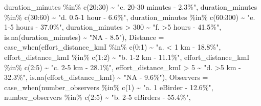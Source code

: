 \documentclass[
]{article}
\newenvironment{Shaded}{\begin{snugshade}}{\end{snugshade}}
\newcommand{\AttributeTok}[1]{\textcolor[rgb]{0.77,0.63,0.00}{#1}}
\newcommand{\DecValTok}[1]{\textcolor[rgb]{0.00,0.00,0.81}{#1}}
\newcommand{\FunctionTok}[1]{\textcolor[rgb]{0.00,0.00,0.00}{#1}}
\newcommand{\NormalTok}[1]{#1}
\newcommand{\SpecialCharTok}[1]{\textcolor[rgb]{0.00,0.00,0.00}{#1}}
\newcommand{\StringTok}[1]{\textcolor[rgb]{0.31,0.60,0.02}{#1}}
\begin{document}
\begin{Shaded}
\begin{Highlighting}[]
\NormalTok{                              duration\_minutes }\SpecialCharTok{\%in\%} \FunctionTok{c}\NormalTok{(}\DecValTok{20}\SpecialCharTok{:}\DecValTok{30}\NormalTok{) }\SpecialCharTok{\textasciitilde{}} \StringTok{"c. 20{-}30 minutes {-} 2.3\%"}\NormalTok{,}
\NormalTok{                              duration\_minutes }\SpecialCharTok{\%in\%} \FunctionTok{c}\NormalTok{(}\DecValTok{30}\SpecialCharTok{:}\DecValTok{60}\NormalTok{) }\SpecialCharTok{\textasciitilde{}} \StringTok{"d. 0.5{-}1 hour {-} 6.6\%"}\NormalTok{,}
\NormalTok{                              duration\_minutes }\SpecialCharTok{\%in\%} \FunctionTok{c}\NormalTok{(}\DecValTok{60}\SpecialCharTok{:}\DecValTok{300}\NormalTok{) }\SpecialCharTok{\textasciitilde{}} \StringTok{"e. 1{-}5 hours {-} 37.0\%"}\NormalTok{,}
\NormalTok{                              duration\_minutes }\SpecialCharTok{\textgreater{}} \DecValTok{300} \SpecialCharTok{\textasciitilde{}} \StringTok{"f. \textgreater{}5 hours {-} 41.5\%"}\NormalTok{,}
                              \FunctionTok{is.na}\NormalTok{(duration\_minutes) }\SpecialCharTok{\textasciitilde{}} \StringTok{"NA {-} 8.5"}\NormalTok{),}
         \AttributeTok{Distance =} \FunctionTok{case\_when}\NormalTok{(effort\_distance\_kmI }\SpecialCharTok{\%in\%} \FunctionTok{c}\NormalTok{(}\DecValTok{0}\SpecialCharTok{:}\DecValTok{1}\NormalTok{) }\SpecialCharTok{\textasciitilde{}} \StringTok{"a. \textless{} 1 km {-} 18.8\%"}\NormalTok{,}
\NormalTok{                              effort\_distance\_kmI }\SpecialCharTok{\%in\%} \FunctionTok{c}\NormalTok{(}\DecValTok{1}\SpecialCharTok{:}\DecValTok{2}\NormalTok{) }\SpecialCharTok{\textasciitilde{}} \StringTok{"b. 1{-}2 km {-} 11.1\%"}\NormalTok{,}
\NormalTok{                              effort\_distance\_kmI }\SpecialCharTok{\%in\%} \FunctionTok{c}\NormalTok{(}\DecValTok{2}\SpecialCharTok{:}\DecValTok{5}\NormalTok{) }\SpecialCharTok{\textasciitilde{}} \StringTok{"c. 2{-}5 km {-} 28.1\%"}\NormalTok{,}
\NormalTok{                              effort\_distance\_kmI }\SpecialCharTok{\textgreater{}} \DecValTok{5} \SpecialCharTok{\textasciitilde{}} \StringTok{"d. \textgreater{}5 km {-} 32.3\%"}\NormalTok{,}
                              \FunctionTok{is.na}\NormalTok{(effort\_distance\_kmI) }\SpecialCharTok{\textasciitilde{}} \StringTok{"NA {-} 9.6\%"}\NormalTok{),}
         \AttributeTok{Observers =} \FunctionTok{case\_when}\NormalTok{(number\_observers }\SpecialCharTok{\%in\%} \FunctionTok{c}\NormalTok{(}\DecValTok{1}\NormalTok{) }\SpecialCharTok{\textasciitilde{}} \StringTok{"a. 1 eBirder {-} 12.6\%"}\NormalTok{,}
\NormalTok{                               number\_observers }\SpecialCharTok{\%in\%} \FunctionTok{c}\NormalTok{(}\DecValTok{2}\SpecialCharTok{:}\DecValTok{5}\NormalTok{) }\SpecialCharTok{\textasciitilde{}} \StringTok{"b. 2{-}5 eBirders {-} 55.4\%"}\NormalTok{,}

\end{Highlighting}
\end{Shaded}
\end{document}

